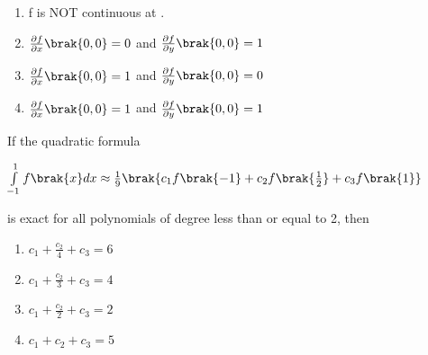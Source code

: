 \begin{enumerate} 
\item f is NOT continuous at .
\item  $\frac{\partial{f}}{\partial x}\brak{0,0} = 0$ and $\frac{\partial{f}}{\partial y}\brak{0,0} = 1$
\item  $\frac{\partial{f}}{\partial x}\brak{0,0} = 1$ and $\frac{\partial{f}}{\partial y}\brak{0,0} = 0$
\item  $\frac{\partial{f}}{\partial x}\brak{0,0} = 1$ and $\frac{\partial{f}}{\partial y}\brak{0,0} = 1$
\end{enumerate}
\item %
If the quadratic formula 
\begin{center}
    $\int\limits_{-1}^1 f\brak{x}dx \approx\frac{1}{9}\brak{c_1f\brak{-1}+c_2f\brak{\frac{1}{2}}+c_3f\brak{1}}$
\end{center}
is exact for all polynomials of degree less than or equal to 2, then
\begin{enumerate} 
\item $c_1+\frac{c_2}{4}+c_3=6$
\item $c_1+\frac{c_2}{3}+c_3=4$ 
\item $c_1+\frac{c_2}{2}+c_3=2$
\item $c_1+c_2+c_3=5$
\end{enumerate}

